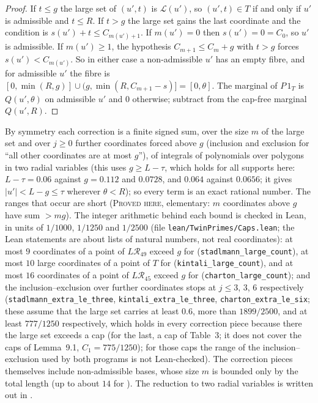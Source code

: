 \documentclass[11pt]{amsart}
\theoremstyle{definition}
\theoremstyle{remark}
\newcommand{\lbl}[1]{\textup{\textsc{#1}}}
\newcommand{\R}{\mathcal{R}}
\begin{document}
\begin{proof}
If $t\le g$ the large set of $(u',t)$ is $\mathcal L(u')$, so $(u',t)\in T$ if and only
if $u'$ is admissible and $t\le R$. If $t>g$ the large set gains the last
coordinate and the condition is $s(u')+t\le C_{m(u')+1}$. If $m(u')=0$ then
$s(u')=0=C_0$, so $u'$ is admissible. If $m(u')\ge1$, the hypothesis
$C_{m+1}\le C_m+g$ with $t>g$ forces $s(u')<C_{m(u')}$. So in either case a
non-admissible $u'$ has an empty fibre, and for admissible $u'$ the fibre is
$[0,\min(R,g)]\cup(g,\min(R,C_{m+1}-s)]=[0,\theta]$. The marginal of $P\,1_T$ is
$Q(u',\theta)$ on admissible $u'$ and $0$ otherwise; subtract from the cap-free
marginal $Q(u',R)$.
\end{proof}

By symmetry each correction is a finite signed sum, over the size $m$ of the
large set and over $j\ge0$ further coordinates forced above $g$ (inclusion and
exclusion for ``all other coordinates are at most $g$''), of integrals of
polynomials over polygons in two radial variables (this uses $g\ge L-\tau$,
which holds for all supports here: $L-\tau=0.06$ against $g=0.112$ and
$0.0728$, and $0.064$ against $0.0656$; it gives $|u'|<L-g\le\tau$ wherever
$\theta<R$); so every term is an exact rational number. The ranges that occur are short (\lbl{Proved here},
elementary: $m$ coordinates above $g$ have sum $>mg$). The integer arithmetic
behind each bound is checked in Lean, in units of $1/1000$, $1/1250$ and
$1/2500$ (file \texttt{lean/TwinPrimes/Caps.lean}; the Lean statements are
about lists of natural numbers, not real coordinates): at most $9$
coordinates of a point of $L\R_{49}$ exceed $g$ for \cite{Sta26}
(\texttt{stadlmann\_large\_count}), at most $10$ large coordinates of a point
of $T$ for \cite{Kin26} (\texttt{kintali\_large\_count}), and at most $16$
coordinates of a point of $L\R_{45}$ exceed $g$ for \cite{Cha26}
(\texttt{charton\_large\_count}); and the inclusion--exclusion over further
coordinates stops at $j\le3$, $3$, $6$ respectively
(\texttt{stadlmann\_extra\_le\_three}, \texttt{kintali\_extra\_le\_three},
\texttt{charton\_extra\_le\_six}; these assume that the large set carries at
least $0.6$, more than $1899/2500$, and at least $777/1250$ respectively,
which holds in every correction piece because there the large set exceeds a
cap (for the last, a cap of Table~3; it does not cover the caps of
Lemma~9.1, $C_1=775/1250$); for those caps the range of the inclusion--exclusion used by
both programs is not Lean-checked). The correction pieces themselves include
non-admissible bases, whose size $m$ is bounded only by the total length (up
to about $14$ for \cite{Kin26}). The reduction to two radial variables is
written out in \cite[\S5]{Kim26}.
\end{document}
